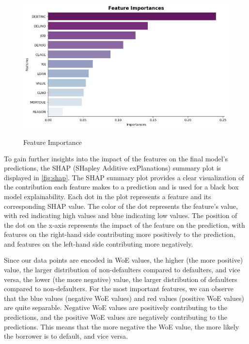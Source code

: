 \begin{figure}[H]
    \centering
    \caption{Feature Importance}\vspace{0.5em}
    \label{fig:fi}\
    \includegraphics[width=140mm]{Figures/fi.jpg}
    \vspace{-1em}
\end{figure}

To gain further insights into the impact of the features on the final model's predictions, the SHAP (SHapley Additive exPlanations) summary plot is displayed in \autoref{fig:shap}.
The SHAP summary plot provides a clear visualization of the contribution each feature makes to a prediction and is used for a black box model explainability.
Each dot in the plot represents a feature and its corresponding SHAP value.
The color of the dot represents the feature's value, with red indicating high values and blue indicating low values.
The position of the dot on the x-axis represents the impact of the feature on the prediction, with features on the right-hand side contributing more positively to the prediction, and features on the left-hand side contributing more negatively.

Since our data points are encoded in WoE values, the higher (the more positive) value, the larger distribution of non-defaulters compared to defaulters, and vice versa, the lower (the more negative) value, the larger distribution of defaulters compared to non-defaulters.
For the most important features, we can observe that the blue values (negative WoE values) and red values (positive WoE values) are quite separable.
Negative WoE values are positively contributing to the predictions, and the positive WoE values are negatively contributing to the predictions. This means that the more negative the WoE value, the more likely the borrower is to default, and vice versa.


